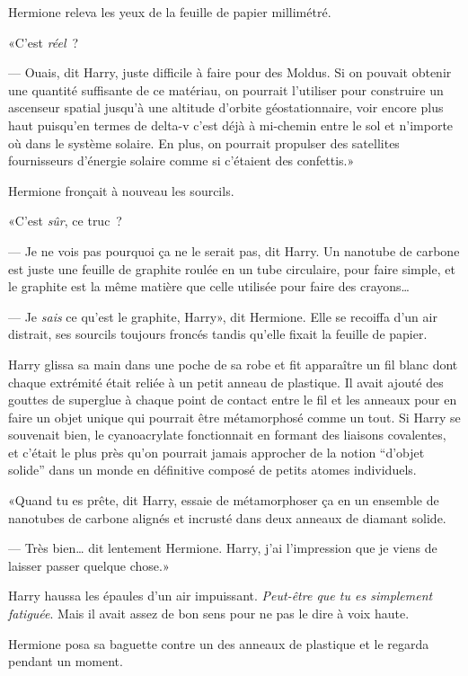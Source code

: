 Hermione releva les yeux de la feuille de papier millimétré.

«C'est \emph{réel}~?

--- Ouais, dit Harry, juste difficile à faire pour des Moldus. Si on pouvait obtenir une quantité suffisante de ce matériau, on pourrait l'utiliser pour construire un ascenseur spatial jusqu'à une altitude d'orbite géostationnaire, voir encore plus haut puisqu'en termes de delta-v c'est déjà à mi-chemin entre le sol et n'importe où dans le système solaire. En plus, on pourrait propulser des satellites fournisseurs d'énergie solaire comme si c'étaient des confettis.»

Hermione fronçait à nouveau les sourcils.

«C'est \emph{sûr}, ce truc~?

--- Je ne vois pas pourquoi ça ne le serait pas, dit Harry. Un nanotube de carbone est juste une feuille de graphite roulée en un tube circulaire, pour faire simple, et le graphite est la même matière que celle utilisée pour faire des crayons…

--- Je \emph{sais} ce qu'est le graphite, Harry», dit Hermione. Elle se recoiffa d'un air distrait, ses sourcils toujours froncés tandis qu'elle fixait la feuille de papier.

Harry glissa sa main dans une poche de sa robe et fit apparaître un fil blanc dont chaque extrémité était reliée à un petit anneau de plastique. Il avait ajouté des gouttes de superglue à chaque point de contact entre le fil et les anneaux pour en faire un objet unique qui pourrait être métamorphosé comme un tout. Si Harry se souvenait bien, le cyanoacrylate fonctionnait en formant des liaisons covalentes, et c'était le plus près qu'on pourrait jamais approcher de la notion “d'objet solide” dans un monde en définitive composé de petits atomes individuels.

«Quand tu es prête, dit Harry, essaie de métamorphoser ça en un ensemble de nanotubes de carbone alignés et incrusté dans deux anneaux de diamant solide.

--- Très bien… dit lentement Hermione. Harry, j'ai l'impression que je viens de laisser passer quelque chose.»

Harry haussa les épaules d'un air impuissant. \emph{Peut-être que tu es simplement fatiguée}. Mais il avait assez de bon sens pour ne pas le dire à voix haute.

Hermione posa sa baguette contre un des anneaux de plastique et le regarda pendant un moment.

